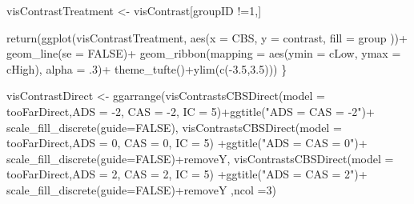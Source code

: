 \documentclass[
  10pt,
  dvipsnames,enabledeprecatedfontcommands]{scrartcl}
\newenvironment{Shaded}{\begin{snugshade}}{\end{snugshade}}
\newcommand{\AttributeTok}[1]{\textcolor[rgb]{0.77,0.63,0.00}{#1}}
\newcommand{\ConstantTok}[1]{\textcolor[rgb]{0.00,0.00,0.00}{#1}}
\newcommand{\DecValTok}[1]{\textcolor[rgb]{0.00,0.00,0.81}{#1}}
\newcommand{\FloatTok}[1]{\textcolor[rgb]{0.00,0.00,0.81}{#1}}
\newcommand{\FunctionTok}[1]{\textcolor[rgb]{0.00,0.00,0.00}{#1}}
\newcommand{\NormalTok}[1]{#1}
\newcommand{\OtherTok}[1]{\textcolor[rgb]{0.56,0.35,0.01}{#1}}
\newcommand{\SpecialCharTok}[1]{\textcolor[rgb]{0.00,0.00,0.00}{#1}}
\newcommand{\StringTok}[1]{\textcolor[rgb]{0.31,0.60,0.02}{#1}}
\begin{document}
\begin{Shaded}
\begin{Highlighting}[]
\NormalTok{  visContrastTreatment }\OtherTok{\textless{}{-}}\NormalTok{ visContrast[groupID }\SpecialCharTok{!=}\DecValTok{1}\NormalTok{,]}
  
  \FunctionTok{return}\NormalTok{(}\FunctionTok{ggplot}\NormalTok{(visContrastTreatment, }\FunctionTok{aes}\NormalTok{(}\AttributeTok{x =}\NormalTok{ CBS, }\AttributeTok{y =}\NormalTok{ contrast, }\AttributeTok{fill =}\NormalTok{ group ))}\SpecialCharTok{+}
           \FunctionTok{geom\_line}\NormalTok{(}\AttributeTok{se =} \ConstantTok{FALSE}\NormalTok{)}\SpecialCharTok{+}
           \FunctionTok{geom\_ribbon}\NormalTok{(}\AttributeTok{mapping =} 
                         \FunctionTok{aes}\NormalTok{(}\AttributeTok{ymin =}\NormalTok{ cLow, }\AttributeTok{ymax =}\NormalTok{ cHigh),  }
                       \AttributeTok{alpha =}\NormalTok{ .}\DecValTok{3}\NormalTok{)}\SpecialCharTok{+}
           \FunctionTok{theme\_tufte}\NormalTok{()}\SpecialCharTok{+}\FunctionTok{ylim}\NormalTok{(}\FunctionTok{c}\NormalTok{(}\SpecialCharTok{{-}}\FloatTok{3.5}\NormalTok{,}\FloatTok{3.5}\NormalTok{)))}
\NormalTok{\}}

\NormalTok{visContrastDirect }\OtherTok{\textless{}{-}}  \FunctionTok{ggarrange}\NormalTok{(}\FunctionTok{visContrastsCBSDirect}\NormalTok{(}\AttributeTok{model =}\NormalTok{ tooFarDirect,}\AttributeTok{ADS =} \SpecialCharTok{{-}}\DecValTok{2}\NormalTok{, }\AttributeTok{CAS =} \SpecialCharTok{{-}}\DecValTok{2}\NormalTok{, }\AttributeTok{IC =} \DecValTok{5}\NormalTok{)}\SpecialCharTok{+}\FunctionTok{ggtitle}\NormalTok{(}\StringTok{"ADS = CAS = {-}2"}\NormalTok{)}\SpecialCharTok{+} \FunctionTok{scale\_fill\_discrete}\NormalTok{(}\AttributeTok{guide=}\ConstantTok{FALSE}\NormalTok{),}
          \FunctionTok{visContrastsCBSDirect}\NormalTok{(}\AttributeTok{model =}\NormalTok{ tooFarDirect,}\AttributeTok{ADS =} \DecValTok{0}\NormalTok{, }\AttributeTok{CAS =} \DecValTok{0}\NormalTok{, }\AttributeTok{IC =} \DecValTok{5}\NormalTok{) }\SpecialCharTok{+}\FunctionTok{ggtitle}\NormalTok{(}\StringTok{"ADS = CAS = 0"}\NormalTok{)}\SpecialCharTok{+} \FunctionTok{scale\_fill\_discrete}\NormalTok{(}\AttributeTok{guide=}\ConstantTok{FALSE}\NormalTok{)}\SpecialCharTok{+}\NormalTok{removeY,}
          \FunctionTok{visContrastsCBSDirect}\NormalTok{(}\AttributeTok{model =}\NormalTok{ tooFarDirect,}\AttributeTok{ADS =} \DecValTok{2}\NormalTok{, }\AttributeTok{CAS =} \DecValTok{2}\NormalTok{, }\AttributeTok{IC =} \DecValTok{5}\NormalTok{) }\SpecialCharTok{+}\FunctionTok{ggtitle}\NormalTok{(}\StringTok{"ADS = CAS = 2"}\NormalTok{)}\SpecialCharTok{+} \FunctionTok{scale\_fill\_discrete}\NormalTok{(}\AttributeTok{guide=}\ConstantTok{FALSE}\NormalTok{)}\SpecialCharTok{+}\NormalTok{removeY}
\NormalTok{          ,}\AttributeTok{ncol =}\DecValTok{3}\NormalTok{)}
\end{Highlighting}
\end{Shaded}
\end{document}
